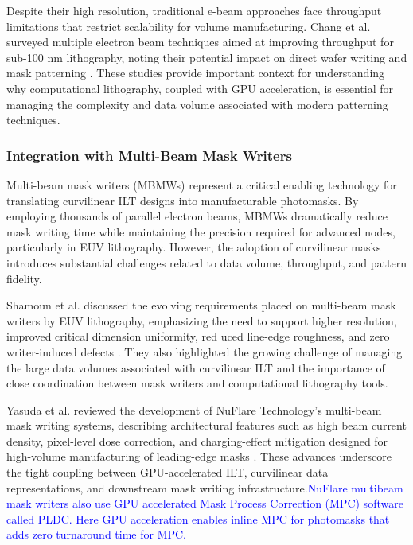 \documentclass[pdflatex,sn-mathphys-num]{sn-jnl}%
\theoremstyle{thmstyleone}%
\theoremstyle{thmstyletwo}%
\theoremstyle{thmstylethree}%
\begin{document}
Despite their high resolution, traditional e-beam approaches face throughput limitations that restrict scalability for volume manufacturing. Chang et al. surveyed multiple electron beam techniques aimed at improving throughput for sub-100 nm lithography, noting their potential impact on direct wafer writing and mask patterning \cite{CHANG2001117}. These studies provide important context for understanding why computational lithography, coupled with GPU acceleration, is essential for managing the complexity and data volume associated with modern patterning techniques.

\subsubsection{Integration with Multi-Beam Mask Writers}
Multi-beam mask writers (MBMWs) represent a critical enabling technology for translating curvilinear ILT designs into manufacturable photomasks. By employing thousands of parallel electron beams, MBMWs dramatically reduce mask writing time while maintaining the precision required for advanced nodes, particularly in EUV lithography. However, the adoption of curvilinear masks introduces substantial challenges related to data volume, throughput, and pattern fidelity.

Shamoun et al. discussed the evolving requirements placed on multi-beam mask writers by EUV lithography, emphasizing the need to support higher resolution, improved critical dimension uniformity, red uced line-edge roughness, and zero writer-induced defects \cite{shamoun2021multi}. They also highlighted the growing challenge of managing the large data volumes associated with curvilinear ILT and the importance of close coordination between mask writers and computational lithography tools.

Yasuda et al. reviewed the development of NuFlare Technology’s multi-beam mask writing systems, describing architectural features such as high beam current density, pixel-level dose correction, and charging-effect mitigation designed for high-volume manufacturing of leading-edge masks \cite{yasuda2023recent}. These advances underscore the tight coupling between GPU-accelerated ILT, curvilinear data representations, and downstream mask writing infrastructure.\textcolor{blue}{NuFlare multibeam mask writers also use GPU accelerated Mask Process Correction (MPC) software called PLDC. Here GPU acceleration enables inline MPC for photomasks that adds zero turnaround time for MPC. \cite{Shendre2025} \cite{Nakayamada2024}}
\end{document}
